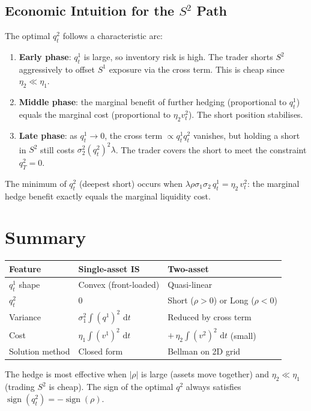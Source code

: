 \documentclass[12pt, a4paper]{article}
\newcommand{\dd}{\,\mathrm{d}}
\begin{document}
\subsection{Economic Intuition for the $S^2$ Path}

The optimal $q^2_t$ follows a characteristic arc:
\begin{enumerate}[leftmargin=1.5em]
  \item \textbf{Early phase}: $q^1_t$ is large, so inventory risk is high.
        The trader shorts $S^2$ aggressively to offset $S^1$ exposure via
        the cross term. This is cheap since $\eta_2 \ll \eta_1$.
  \item \textbf{Middle phase}: the marginal benefit of further hedging
        (proportional to $q^1_t$) equals the marginal cost
        (proportional to $\eta_2 v^2_t$). The short position stabilises.
  \item \textbf{Late phase}: as $q^1_t \to 0$, the cross term $\propto q^1_t q^2_t$
        vanishes, but holding a short in $S^2$ still costs $\sigma_2^2(q^2_t)^2\lambda$.
        The trader covers the short to meet the constraint $q^2_T = 0$.
\end{enumerate}

The minimum of $q^2_t$ (deepest short) occurs when
$\lambda\rho\sigma_1\sigma_2\,q^1_t = \eta_2\,v^2_t$:
the marginal hedge benefit exactly equals the marginal liquidity cost.

\section{Summary}

\begin{resultbox}
\begin{center}
  \renewcommand{\arraystretch}{1.6}
  \begin{tabular}{@{}lll@{}}
    \toprule
    \textbf{Feature} & \textbf{Single-asset IS} & \textbf{Two-asset} \\
    \midrule
    $q^1_t$ shape & Convex (front-loaded) & Quasi-linear \\
    $q^2_t$ & $0$ & Short ($\rho>0$) or Long ($\rho<0$) \\
    Variance & $\sigma_1^2\int(q^1)^2\,\dd t$ & Reduced by cross term \\
    Cost & $\eta_1\int(v^1)^2\,\dd t$ & $+\,\eta_2\int(v^2)^2\,\dd t$ (small) \\
    Solution method & Closed form & Bellman on 2D grid \\
    \bottomrule
  \end{tabular}
\end{center}

\medskip
The hedge is most effective when $|\rho|$ is large (assets move together)
and $\eta_2 \ll \eta_1$ (trading $S^2$ is cheap).
The sign of the optimal $q^2$ always satisfies
$\operatorname{sign}(q^2_t) = -\operatorname{sign}(\rho)$.
\end{resultbox}
\end{document}
